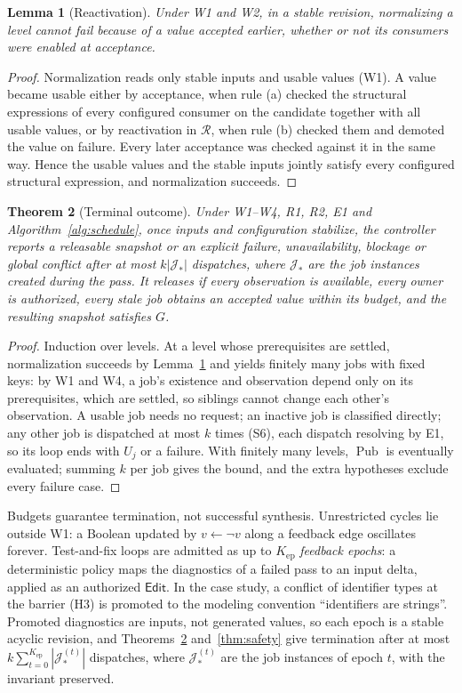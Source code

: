 \documentclass[pdflatex,sn-mathphys-num]{sn-jnl}
\theoremstyle{thmstyleone}%
\newtheorem{theorem}{Theorem}%
\newtheorem{lemma}[theorem]{Lemma}%
\theoremstyle{thmstyletwo}%
\theoremstyle{thmstylethree}%
\newcommand{\Jobs}{\mathcal J}
\newcommand{\Pub}{\operatorname{Pub}}
\begin{document}
\begin{lemma}[Reactivation]\label{lem:react}
Under W1 and W2, in a stable revision, normalizing a level cannot fail because of a value accepted earlier, whether or not its consumers were enabled at acceptance.
\end{lemma}
\begin{proof}
Normalization reads only stable inputs and usable values (W1). A value became usable either by acceptance, when rule (a) checked the structural expressions of every configured consumer on the candidate together with all usable values, or by reactivation in $\mathcal R$, when rule (b) checked them and demoted the value on failure. Every later acceptance was checked against it in the same way. Hence the usable values and the stable inputs jointly satisfy every configured structural expression, and normalization succeeds.
\end{proof}

\begin{theorem}[Terminal outcome]\label{thm:termination}
Under W1--W4, R1, R2, E1 and Algorithm~\ref{alg:schedule}, once inputs and configuration stabilize, the controller reports a releasable snapshot or an explicit failure, unavailability, blockage or global conflict after at most $k|\Jobs_*|$ dispatches, where $\Jobs_*$ are the job instances created during the pass. It releases if every observation is available, every owner is authorized, every stale job obtains an accepted value within its budget, and the resulting snapshot satisfies $G$.
\end{theorem}
\begin{proof}
Induction over levels. At a level whose prerequisites are settled, normalization succeeds by Lemma~\ref{lem:react} and yields finitely many jobs with fixed keys: by W1 and W4, a job's existence and observation depend only on its prerequisites, which are settled, so siblings cannot change each other's observation. A usable job needs no request; an inactive job is classified directly; any other job is dispatched at most $k$ times (S6), each dispatch resolving by E1, so its loop ends with $U_j$ or a failure. With finitely many levels, $\Pub$ is eventually evaluated; summing $k$ per job gives the bound, and the extra hypotheses exclude every failure case.
\end{proof}
Budgets guarantee termination, not successful synthesis. Unrestricted cycles lie outside W1: a Boolean updated by $v\gets\neg v$ along a feedback edge oscillates forever. Test-and-fix loops are admitted as up to $K_{\mathrm{ep}}$ \emph{feedback epochs}: a deterministic policy maps the diagnostics of a failed pass to an input delta, applied as an authorized $\mathsf{Edit}$. In the case study, a conflict of identifier types at the barrier (H3) is promoted to the modeling convention ``identifiers are strings''. Promoted diagnostics are inputs, not generated values, so each epoch is a stable acyclic revision, and Theorems~\ref{thm:termination} and~\ref{thm:safety} give termination after at most $k\sum_{t=0}^{K_{\mathrm{ep}}}|\Jobs_*^{(t)}|$ dispatches, where $\Jobs_*^{(t)}$ are the job instances of epoch $t$, with the invariant preserved.
\end{document}
